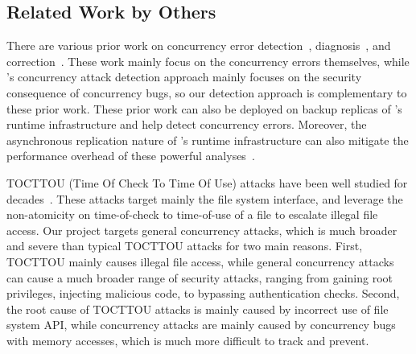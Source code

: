 


\subsection{Related Work by Others} \label{sec:others-work}

 There are various prior work on concurrency error 
detection~\cite{yu:racetrack:sosp,savage:eraser,racerx:sosp03,lu:muvi:sosp,
avio:asplos06,conmem:asplos10}, diagnosis~\cite{racefuzzer:pldi08,
ctrigger:asplos09,atomfuzzer:fse08}, 
and correction~\cite{dimmunix:osdi08,gadara:osdi08,wu:loom:osdi10,cfix:osdi12}. 
These work mainly focus on the concurrency errors themselves, while \xxx's 
concurrency attack detection approach mainly focuses on the security 
consequence of concurrency bugs, so our detection approach is complementary to 
these prior work. These prior work can also be deployed on backup 
replicas of \xxx's runtime infrastructure and help \xxx detect concurrency 
errors. Moreover, the asynchronous replication nature of \xxx's runtime 
infrastructure can also mitigate the performance overhead of these powerful 
analyses~\cite{repframe:apsys15}.

 TOCTTOU (Time Of Check To Time Of Use) 
attacks have been well studied for 
decades~\cite{bishop:tocttou,toctou:fast08,toctou:fast05,toctou:usec03}. These 
attacks target mainly the file system interface, and leverage the non-atomicity 
on time-of-check to time-of-use of a file to escalate illegal file access. Our 
\xxx project targets general concurrency attacks, which is much broader and 
severe than typical TOCTTOU attacks for two main reasons. First, TOCTTOU 
mainly causes illegal file access, while general concurrency attacks can cause 
a much broader range of security attacks, ranging from gaining root privileges, 
injecting malicious code, to bypassing authentication checks. Second, the root 
cause of TOCTTOU attacks is mainly caused by incorrect use of file system API, 
while concurrency attacks are mainly caused by concurrency bugs with memory 
accesses, which is much more difficult to track and prevent.

